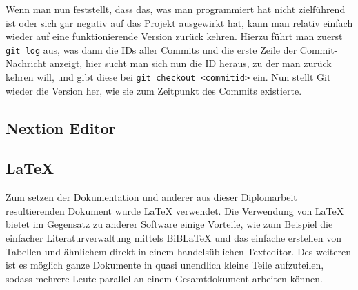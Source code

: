 Wenn man nun feststellt, dass das, was man programmiert hat nicht zielführend ist oder sich gar negativ auf das Projekt ausgewirkt hat, kann man relativ einfach wieder auf eine funktionierende Version zurück kehren. Hierzu führt man zuerst \texttt{git log} aus, was dann die IDs aller Commits und die erste Zeile der Commit-Nachricht anzeigt, hier sucht man sich nun die ID heraus, zu der man zurück kehren will, und gibt diese bei \texttt{git checkout <commitid>} ein. Nun stellt Git wieder die Version her, wie sie zum Zeitpunkt des Commits existierte.

\subsection{Nextion Editor}

\subsection{\LaTeX{}}
Zum setzen der Dokumentation und anderer aus dieser Diplomarbeit resultierenden Dokument wurde \LaTeX{} verwendet. Die Verwendung von \LaTeX{} bietet im Gegensatz zu anderer Software einige Vorteile, wie zum Beispiel die einfacher Literaturverwaltung mittels BiB\LaTeX{} und das einfache erstellen von Tabellen und ähnlichem direkt in einem handelsüblichen Texteditor. Des weiteren ist es möglich ganze Dokumente in quasi unendlich kleine Teile aufzuteilen, sodass mehrere Leute parallel an einem Gesamtdokument arbeiten können.